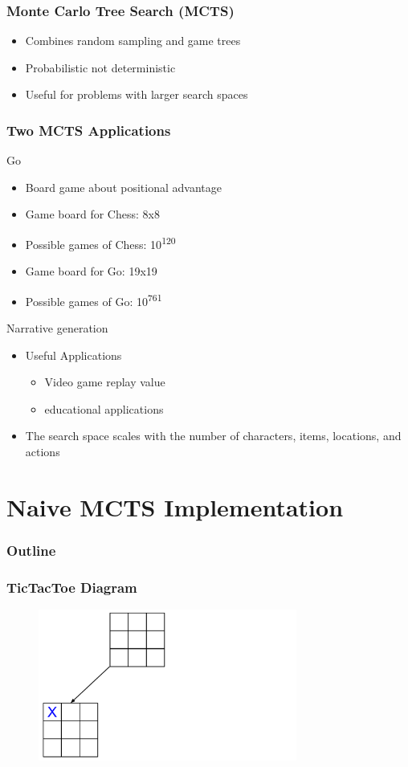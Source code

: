 \documentclass{beamer}
\begin{document}
\begin{frame}
\frametitle{Monte Carlo Tree Search (MCTS)}
\begin{itemize}
	\item Combines random sampling and game trees
	\item Probabilistic not deterministic
	\item Useful for problems with larger search spaces
\end{itemize}
\end{frame}

\begin{frame}
\frametitle{Two MCTS Applications}
Go
\begin{itemize}
	\item Board game about positional advantage
	\item Game board for Chess: 8x8
	\item Possible games of Chess: 10\textsuperscript{120}
	\item Game board for Go: 19x19
	\item Possible games of Go: 10\textsuperscript{761}
\end{itemize}
Narrative generation
\begin{itemize}
	\item Useful Applications
	\begin{itemize}
		\item Video game replay value
		\item educational applications
	\end{itemize}
	\item The search space scales with the number of characters, items, locations, and actions
\end{itemize}
\end{frame}

\section{Naive MCTS Implementation}

\begin{frame}
\frametitle{Outline}
\tableofcontents[currentsection]
\end{frame}

\begin{frame}[fragile]
\frametitle{TicTacToe Diagram}
\begin{figure}[h]
	\includegraphics[width=8.5cm]{Diagrams/TicTacToe/TicTacToeTreeOne.pdf}
	\centering
\end{figure}
\end{frame}
\end{document}
